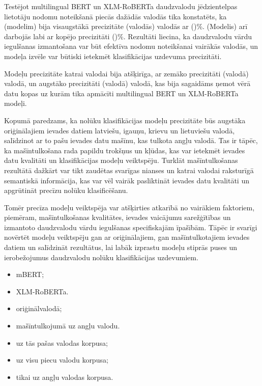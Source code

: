
Testējot multilingual BERT un XLM-RoBERTa daudzvalodu jēdzientelpas lietotāju nodomu noteikšanā piecās dažādās valodās tika konstatēts, ka (modelim) bija visaugstākā precizitāte (valodās) valodās ar ()\%. (Modelis) arī darbojās labi ar kopējo precizitāti ()\%. Rezultāti liecina, ka daudzvalodu vārdu iegulšanas izmantošana var būt efektīva nodomu noteikšanai vairākās valodās, un modeļa izvēle var būtiski ietekmēt klasifikācijas uzdevuma precizitāti.

Modeļu precizitāte katrai valodai bija atšķirīga, ar zemāko precizitāti (valodā) valodā, un augstāko precizitāti (valodā) valodā, kas bija sagaidāms ņemot vērā datu kopas uz kurām tika apmācīti multilingual BERT un XLM-RoBERTa modeļi. 


Kopumā paredzams, ka nolūku klasifikācijas modeļu precizitāte būs augstāka oriģinālajiem ievades datiem latviešu, igauņu, krievu un lietuviešu valodā, salīdzinot ar to pašu ievades datu mašīnu, kas tulkota angļu valodā. Tas ir tāpēc, ka mašīntulkošana rada papildu trokšņus un kļūdas, kas var ietekmēt ievades datu kvalitāti un klasifikācijas modeļu veiktspēju. Turklāt mašīntulkošanas rezultātā dažkārt var tikt zaudētas svarīgas nianses un katrai valodai raksturīgā semantiskā informācija, kas var vēl vairāk pasliktināt ievades datu kvalitāti un apgrūtināt precīzu nolūku klasificēšanu.

Tomēr precīza modeļu veiktspēja var atšķirties atkarībā no vairākiem faktoriem, piemēram, mašīntulkošanas kvalitātes, ievades vaicājumu sarežģītības un izmantoto daudzvalodu vārdu iegulšanas specifiskajām īpašībām. Tāpēc ir svarīgi novērtēt modeļu veiktspēju gan ar oriģinālajiem, gan mašīntulkotajiem ievades datiem un salīdzināt rezultātus, lai labāk izprastu modeļu stiprās puses un ierobežojumus daudzvalodu nolūku klasifikācijas uzdevumiem.



\begin{itemize}
    \item mBERT;
    \item XLM-RoBERTa.
\end{itemize}

\begin{itemize}
    \item oriģinālvalodā;
    \item mašīntulkojumā uz angļu valodu.
\end{itemize}


\begin{itemize}
    \item uz tās pašas valodas korpusa;
    \item uz visu piecu valodu korpusa;
    \item tikai uz angļu valodas korpusa.
\end{itemize}
